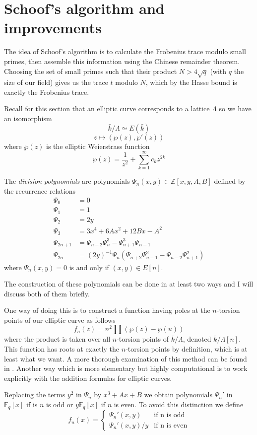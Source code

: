 \section{Schoof's algorithm and improvements}
The idea of Schoof's algorithm is to calculate the Frobenius trace modulo small primes,
then assemble this information using the Chinese remainder theorem. Choosing the set
of small primes such that their product $N > 4 \sqrt q$ (with $q$ the size of our
field) gives us the trace $t$ modulo $N$, which by the Hasse bound is exactly
the Frobenius trace.

Recall for this section that an elliptic curve corresponds to a lattice $\Lambda$
so we have an isomorphism
$$ \bar{k}/\Lambda \simeq E(\bar{k}) $$
$$ z \mapsto (\wp(z), \wp '(z)) $$
where $\wp(z)$ is the elliptic Weierstrass function
$$\wp(z) = \frac{1}{z^2} + \sum_{k=1}^\infty c_k z^{2k} $$

\begin{mydef}
 The \emph{division polynomials} are polynomials $\Psi_n(x,y) \in \mathbb{Z}[x,y,A,B]$
defined by the recurrence relations
\begin{align*}
  \Psi_0 &= 0 \\
  \Psi_1 &= 1 \\
  \Psi_2 &= 2y \\
  \Psi_3 &= 3x^4 + 6Ax^2 + 12Bx - A^2 \\
  \Psi_{2n+1} &= \Psi_{n+2} \Psi_n^3 - \Psi_{n+1}^3 \Psi_{n-1} \\
  \Psi_{2n}   &= (2y)^{-1} \Psi_n(\Psi_{n+2} \Psi_{n-1}^2 - \Psi_{n-2} \Psi_{n+1}^2)
\end{align*}
where $\Psi_n(x,y) = 0$ is and only if $(x,y) \in E[n]$.
\end{mydef}
The construction of these polynomials can be done in at least two ways and I will discuss
both of them briefly.

One way of doing this is to construct
a function having poles at the $n$-torsion points of our elliptic curve as follows
$$ f_n(z) = n^2 \prod(\wp(z) - \wp(u)) $$
where the product is taken over all $n$-torsion points of $\bar{k}/\Lambda$, denoted
$\bar{k}/\Lambda[n]$. This function has roots at exactly the $n$-torsion points by definition,
which is at least what we want. A more thorough examination of this method can be found
in \cite{Lang}.
Another way which is more elementary but highly computational is to work explicitly
with the addition formulas for elliptic curves.

Replacing the terms $y^2$ in $\Psi_n$ by $x^3 + Ax + B$ we obtain polynomials $\Psi_n '$ in
$\mathbb{F}_q[x]$ if is $n$ is odd or $y \mathbb{F}_q[x]$ if $n$ is even. To avoid
this distinction we define
$$
f_n(x) = \begin{cases}
          \Psi_n '(x,y) & \text{if n is odd} \\
	  \Psi_n '(x,y)/y & \text{if n is even}
         \end{cases}
$$


